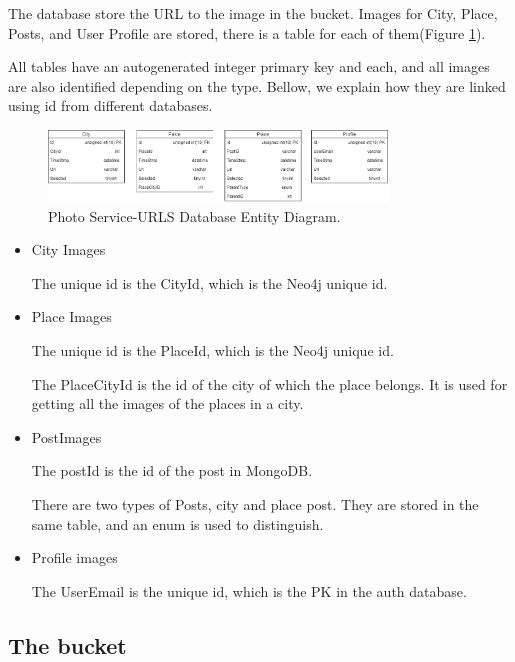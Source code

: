 The database store the URL to the image in the bucket. Images for City, Place, Posts, and User Profile are stored, there is a table for each of them(Figure \ref{photo:dbentity}).

All tables have an autogenerated integer primary key and each, and all images are also identified depending on the type. Bellow, we explain how they are linked using id from different databases.


\begin{figure}
	\begin{center}
		\includegraphics[width=90mm,scale=1]{img/photos/photo-db-entity.png}
		\caption{Photo Service-URLS Database Entity Diagram.}
		\label{photo:dbentity}
	\end{center}
\end{figure}

\begin{itemize}
	\item City Images
	
	\subitem The unique id is the CityId, which is the Neo4j unique id.
	
	\item	Place Images
	
	\subitem	The unique id is the PlaceId, which is the Neo4j unique id.
	
	\subitem The PlaceCityId is the id of the city of which the place belongs. It is used for getting all the images of the places in a city. 
	
	\item	PostImages
	
	\subitem The postId is the id of the post in MongoDB.
	
	\subitem There are two types of Posts, city and place post. They are stored in the same table, and an enum is used to distinguish.
	
	\item	Profile images
	
	\subitem The  UserEmail is the unique id, which is the PK in the auth database.
\end{itemize}

\subsection{The bucket}

